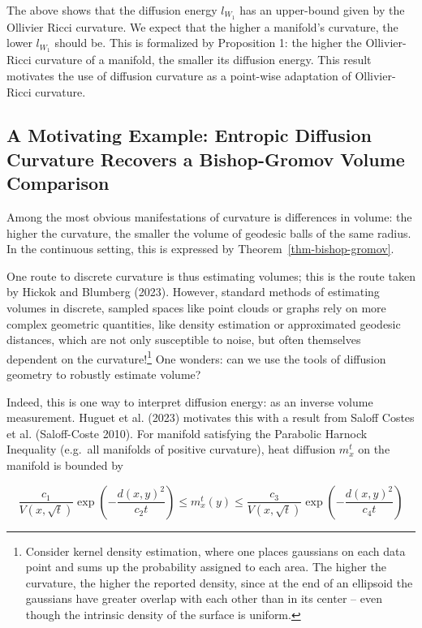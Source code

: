\documentclass[
  letterpaper,
  DIV=11,
  numbers=noendperiod]{scrartcl}
\theoremstyle{plain}
\theoremstyle{definition}
\theoremstyle{plain}
\theoremstyle{definition}
\theoremstyle{plain}
\theoremstyle{remark}
\begin{document}
The above shows that the diffusion energy \(l_{W_1}\) has an upper-bound
given by the Ollivier Ricci curvature. We expect that the higher a
manifold's curvature, the lower \(l_{W_{1}}\) should be. This is
formalized by Proposition 1: the higher the Ollivier-Ricci curvature of
a manifold, the smaller its diffusion energy. This result motivates the
use of diffusion curvature as a point-wise adaptation of Ollivier-Ricci
curvature.

\subsection{A Motivating Example: Entropic Diffusion Curvature Recovers
a Bishop-Gromov Volume
Comparison}\label{a-motivating-example-entropic-diffusion-curvature-recovers-a-bishop-gromov-volume-comparison}

Among the most obvious manifestations of curvature is differences in
volume: the higher the curvature, the smaller the volume of geodesic
balls of the same radius. In the continuous setting, this is expressed
by Theorem~\ref{thm-bishop-gromov}.

One route to discrete curvature is thus estimating volumes; this is the
route taken by Hickok and Blumberg (2023). However, standard methods of
estimating volumes in discrete, sampled spaces like point clouds or
graphs rely on more complex geometric quantities, like density
estimation or approximated geodesic distances, which are not only
susceptible to noise, but often themselves dependent on the
curvature!\footnote{Consider kernel density estimation, where one places
  gaussians on each data point and sums up the probability assigned to
  each area. The higher the curvature, the higher the reported density,
  since at the end of an ellipsoid the gaussians have greater overlap
  with each other than in its center -- even though the intrinsic
  density of the surface is uniform.} One wonders: can we use the tools
of diffusion geometry to robustly estimate volume?

Indeed, this is one way to interpret diffusion energy: as an inverse
volume measurement. Huguet et al. (2023) motivates this with a result
from Saloff Costes et al. (Saloff-Coste 2010). For manifold satisfying
the Parabolic Harnock Inequality (e.g.~all manifolds of positive
curvature), heat diffusion \(m_{x}^t\) on the manifold is bounded by

\[
\frac{c_1}{V(x, \sqrt{t})} \exp \left(-\frac{d(x, y)^2}{c_2 t}\right) \leq m_{x}^t(y) \leq \frac{c_3}{V(x, \sqrt{t})} \exp \left(-\frac{d(x, y)^2}{c_4 t}\right)
\]
\end{document}
